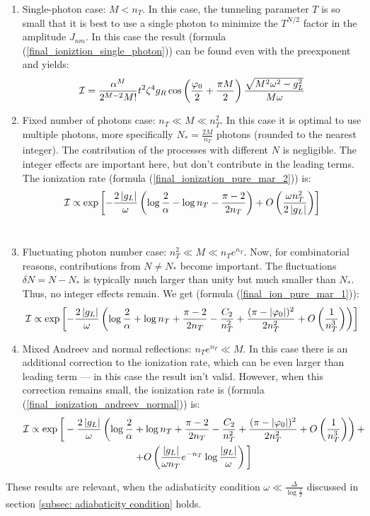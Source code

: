 \begin{enumerate}
	\item Single-photon case: $M<n_{T}$. In this case, the tunneling parameter
	$T$ is so small that it is best to use a single photon to minimize
	the $T^{N/2}$ factor in the amplitude $J_{nm}$. In this case the result (formula (\ref{final_ioniztion_single_photon})) can be found even with the preexponent and yields:
	\begin{equation}
	\mathcal{I}
=
\frac
{\alpha^M}{2^{M-2}M!}
t^2\zeta^4 g_R
\cos
\left(
	\frac{\varphi_0}{2}
	+
	\frac{\pi M}{2}
\right)
\frac
{\sqrt{M^2\omega^2-g_L^2}}
{M\omega}
	\end{equation}
	\item Fixed number of photons case: $n_{T}\ll M\ll n_{T}^{2}$. In this
	case it is optimal to use multiple photons, more specifically 
	$N_{*}=\frac{2M}{n_T}$ photons (rounded to the nearest integer). The contribution of the processes with different $ N $ is negligible. The integer effects are important here, but don't contribute in the leading terms. The ionization rate (formula (\ref{final_ionization_pure_mar_2})) is:
	\begin{equation}
	\mathcal{I}
\propto
\exp
\left[
-\frac{2\left|g_L\right|}{\omega}
\left(
	\log\frac{2}{\alpha}
	-
	\log n_T
	-
	\frac{\pi-2}{2n_T}
\right)
+
O\left(	
	\frac{\omega n_T^2}{2\left|g_L\right|}\right)
\right]
	\end{equation}
	\\
	\item Fluctuating photon number case: $n_{T}^{2}\ll M\ll n_T e^{n_T}$. Now, for combinatorial
	reasons, contributions from $N\neq N_{*}$ become important. 	The fluctuations $\delta N=N-N_{*}$ is
	typically much larger than unity but much smaller than $N_{*}$. Thus, no integer effects remain. We
	get (formula (\ref{final_ion_pure_mar_1})):
	\begin{equation}
	\mathcal{I}
\propto
\exp
\left[
-
\frac{2\left|g_L\right|}{\omega}\left(
	\log\frac{2}{\alpha}
	+
	\log n_T
	+
	\frac{\pi-2}{2n_T}
	-
	\frac{C_2}{n_T^2}
	+
	\frac{(\pi-|\varphi_{0}|)^{2}}
	{2n_T^{2}}
	+
	O\left(\frac{1}{n_T^{3}}\right)\right)	
\right]
	\end{equation}
	\item Mixed Andreev and normal reflections: $ n_T e^{n_T} \ll M$. In this case there is an additional correction to the ionization rate, which can be even larger than leading term --- in this case the result isn't valid. However, when this correction remains small, the ionization rate is (formula (\ref{final_ionization_andreev_normal})) is:
\begin{multline}
\mathcal{I}
\propto
\exp
\bigg[
-
\frac
{2\left|g_L\right|}
{\omega}
\left(
	\log
	\frac{2}{\alpha}
	+
	\log n_T
	+
	\frac{\pi-2}{2n_T}
	-
	\frac{C_2}{n_T^2}
	+
	\frac{(\pi-|\varphi_{0}|)^{2}}{2n_T^{2}}
	+
	O\left(\frac{1}{n_T^3}\right)
\right)
+
\\
+
O
\left( 		\frac{\left|g_L\right|}{\omega n_T}
	e^{-n_T}
	\log\frac{\left|g_L\right|}{\omega}
\right)		
\bigg]
\end{multline}
\end{enumerate}
These results are relevant, when the adiabaticity condition $ \omega \ll \frac{\Delta}{\log \frac{1}{T}} $ discussed in section \ref{subsec: adiabaticity condition} holds.